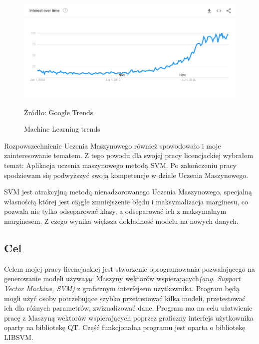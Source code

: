 \documentclass[paper=a4, fontsize=11pt]{scrartcl} %
\numberwithin{equation}{section} %
\numberwithin{figure}{section} %
\newcommand*{\captionsource}[2]{%
  \caption[{#1}]{%
      #1}
    Źródło: #2%
}
\begin{document}
    \begin{figure}[h]
        \begin{center}
            \includegraphics[scale=0.5]{./img/google-trends-ml.png}
            \captionsource{Machine Learning trends}{Google Trends}
            \label{fig:google-trends-ml}
        \end{center}
    \end{figure}

    \par Rozpowszechnienie Uczenia Maszynowego również spowodowało i moje zainteresowanie
    tematem.  Z tego powodu dla swojej pracy licencjackiej wybrałem temat: Aplikacja uczenia
    maszynowego metodą SVM. Po zakończeniu pracy spodziewam się podwyższyć swoją kompetencje w
    dziale Uczenia Maszynowego.
    \par SVM jest atrakcyjną metodą nienadzorowanego Uczenia Maszynowego, specjalną własnością
    której jest ciągłe zmniejszenie błędu i maksymalizacja marginesu, co pozwala nie tylko
    odseparować klasy, a odseparować ich z maksymalnym marginesem. Z czego wynika większa
    dokładność modelu na nowych danych.

\subsection{Cel}
    \par Celem mojej pracy licencjackiej jest stworzenie oprogramowania pozwalającego na
    generowanie modeli używając Maszyny wektorów wspierających\textit{(ang. Support Vector
    Machine, SVM)} z graficznym interfejsem użytkownika.  Program będą mogli użyć osoby
    potrzebujące szybko przetrenować kilka modeli, przetestować ich dla różnych parametrów,
    zwizualizować dane. Program ma na celu ułatwienie pracę z Maszyną wektorów wspierających
    poprzez graficzny interfejs użytkownika oparty na bibliotekę QT. Część funkcjonalna
    programu jest oparta o bibliotekę LIBSVM\cite{CC01a}.
\end{document}
